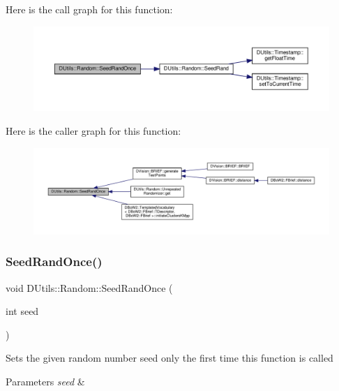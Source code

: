 Here is the call graph for this function\+:\nopagebreak
\begin{figure}[H]
\begin{center}
\leavevmode
\includegraphics[width=350pt]{classDUtils_1_1Random_a168e77d82ce1e66c6759e97ef27adbbc_cgraph}
\end{center}
\end{figure}
Here is the caller graph for this function\+:\nopagebreak
\begin{figure}[H]
\begin{center}
\leavevmode
\includegraphics[width=350pt]{classDUtils_1_1Random_a168e77d82ce1e66c6759e97ef27adbbc_icgraph}
\end{center}
\end{figure}
\mbox{\label{classDUtils_1_1Random_ad3652f5d105ca4f6f22696b64f2a4a5d}} 
\subsubsection{\texorpdfstring{Seed\+Rand\+Once()}{SeedRandOnce()}\hspace{0.1cm}{\footnotesize\ttfamily [2/2]}}
{\footnotesize\ttfamily void D\+Utils\+::\+Random\+::\+Seed\+Rand\+Once (\begin{DoxyParamCaption}\item[{int}]{seed }\end{DoxyParamCaption})\hspace{0.3cm}{\ttfamily [static]}}

Sets the given random number seed only the first time this function is called 
\begin{DoxyParams}{Parameters}
{\em seed} & \\
\hline
\end{DoxyParams}


